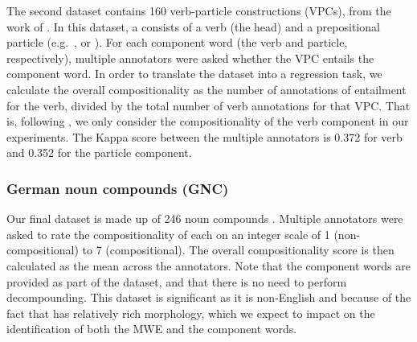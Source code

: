 \documentclass[output=paper,modfonts,nonflat]{langsci/langscibook}
\begin{document}
The second dataset contains 160  verb-particle constructions
(VPCs), from the work of \citet{bannard2006}. In this dataset, a 
 consists of a verb (the head) and a
prepositional particle (e.g.\ ,  or
). For each component word (the verb and particle,
respectively), multiple annotators were asked whether the VPC entails
the component word. In order to translate the dataset into a
regression task, we calculate the overall compositionality as the
number of annotations of entailment for the verb, divided by the total
number of verb annotations for that VPC. That is, following
\citet{bannard2003}, we only consider the compositionality of the verb
component in our experiments.
The Kappa score between the multiple annotators is 0.372 for verb and
0.352 for the particle component.
 




\subsubsection{German noun compounds (GNC)}

Our final dataset is made up of 246  noun compounds
\citep{von2009,SchulteImWalde+:2013}. Multiple annotators were asked to rate the
compositionality of each   on an integer scale of 1
(non-compositional) to 7 (compositional). The overall compositionality
score is then calculated as the mean across the annotators. Note that
the component words are provided as part of the dataset, and that
there is no need to perform decompounding. This dataset is significant 
as it is non-English and because of the fact that 
 has relatively rich
morphology, which we expect to impact on the identification of both
the MWE and the component words.
\end{document}
